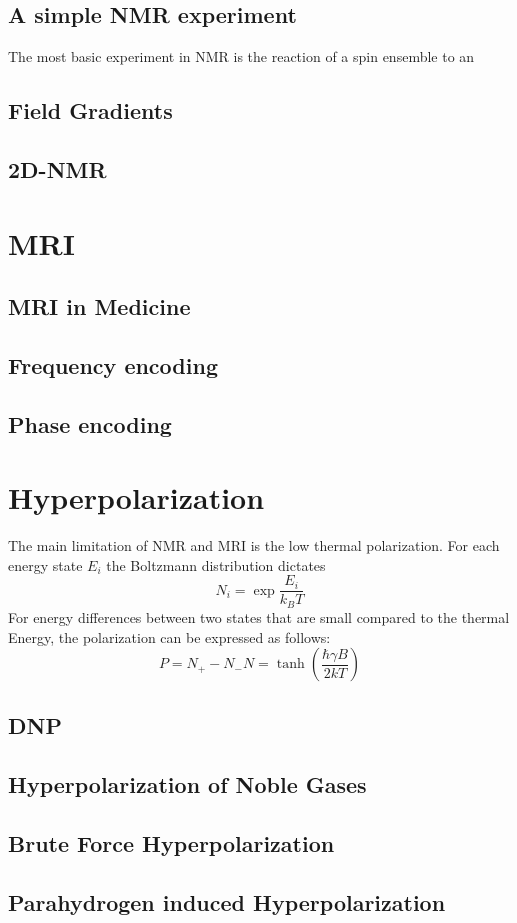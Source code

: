 		\subsection{A simple NMR experiment}
			The most basic experiment in NMR is the reaction of a spin ensemble to an 
		\subsection{Field Gradients}
		\subsection{2D-NMR}
	\section{MRI}
		\subsection{MRI in Medicine}
		\subsection{Frequency encoding}
		\subsection{Phase encoding}
	\section{Hyperpolarization}
		The main limitation of NMR and MRI is the low thermal polarization.
		For each energy state $E_i$ the Boltzmann distribution dictates
		\begin{equation}
			N_i = \exp{\frac{E_i}{k_B T}}
		\end{equation}
		For energy differences between two states that are small compared to
		the thermal Energy, the polarization can be expressed as follows:
		\begin{equation}
			P = {N_+-N_-}{N} = \tanh\left(\frac{\hbar \gamma B}{2 k T }\right)
		\end{equation}
		\subsection{DNP}
		\subsection{Hyperpolarization of Noble Gases}
		\subsection{Brute Force Hyperpolarization}
		\subsection{Parahydrogen induced Hyperpolarization}
